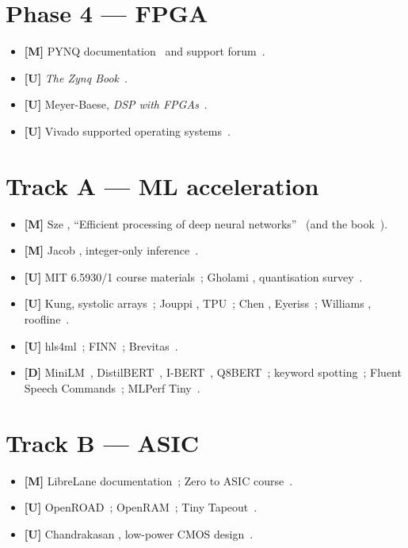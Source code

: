 \section*{Phase 4 --- FPGA}
\begin{itemize}
  \item \textbf{[M]} PYNQ documentation~\cite{ch12-13:pynqdocs} and support
        forum~\cite{ch12-13:pynqforum}.
  \item \textbf{[U]} \emph{The Zynq Book}~\cite{ch12-13:crockett2014zynq}.
  \item \textbf{[U]} Meyer-Baese, \emph{DSP with FPGAs}~\cite{meyerbaese2014fpgadsp}.
  \item \textbf{[U]} Vivado supported operating systems~\cite{ch12-13:ug973}.
\end{itemize}

\section*{Track A --- ML acceleration}
\begin{itemize}
  \item \textbf{[M]} Sze \etal, \enquote{Efficient processing of deep neural
        networks}~\cite{sze2017efficient} (and the book~\cite{sze2020book}).
  \item \textbf{[M]} Jacob \etal, integer-only inference~\cite{jacob2018quantization}.
  \item \textbf{[U]} MIT 6.5930/1 course materials~\cite{ch12-13:mit65930};
        Gholami \etal, quantisation survey~\cite{ch12-13:gholami2021quant}.
  \item \textbf{[U]} Kung, systolic arrays~\cite{kung1982systolic}; Jouppi
        \etal, TPU~\cite{jouppi2017tpu}; Chen \etal, Eyeriss~\cite{chen2017eyeriss};
        Williams \etal, roofline~\cite{williams2009roofline}.
  \item \textbf{[U]} hls4ml~\cite{duarte2018hls4ml,ch12-13:hls4mldocs};
        FINN~\cite{umuroglu2017finn}; Brevitas~\cite{brevitas}.
  \item \textbf{[D]} MiniLM~\cite{wang2020minilm}, DistilBERT~\cite{sanh2019distilbert},
        I-BERT~\cite{kim2021ibert}, Q8BERT~\cite{zafrir2019q8bert}; keyword
        spotting~\cite{zhang2017helloedge}; Fluent Speech
        Commands~\cite{lugosch2019fsc}; MLPerf Tiny~\cite{banbury2021mlperftiny}.
\end{itemize}

\section*{Track B --- ASIC}
\begin{itemize}
  \item \textbf{[M]} LibreLane documentation~\cite{ch12-13:librelanedocs};
        Zero to ASIC course~\cite{ch12-13:zerotoasic}.
  \item \textbf{[U]} OpenROAD~\cite{ajayi2019openroad}; OpenRAM~\cite{guthaus2016openram};
        Tiny Tapeout~\cite{tinytapeout}.
  \item \textbf{[U]} Chandrakasan \etal, low-power CMOS design~\cite{chandrakasan1992lowpower}.
\end{itemize}

